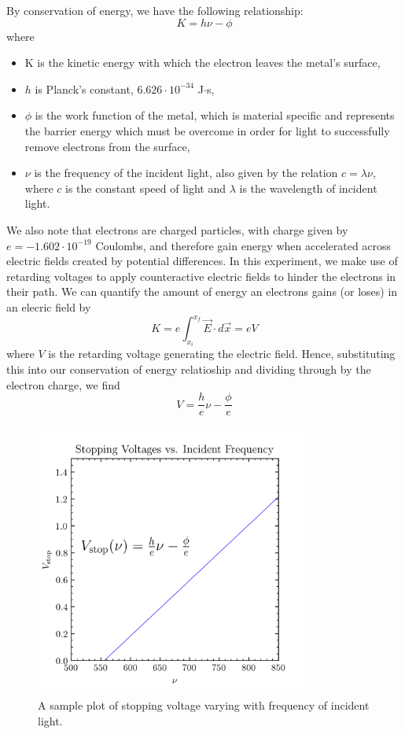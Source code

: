 \documentclass[aps,twocolumn,secnumarabic,balancelastpage,amsmath,amssymb,nofootinbib, floatfix]{revtex4-2}
\begin{document}
By conservation of energy, we have the following relationship:
$$K = h\nu - \phi$$ where
\begin{itemize}
	\item K is the kinetic energy with which the electron leaves the metal's surface,
	\item $h$ is Planck's constant, $6.626\cdot 10^{-34}$ J$\cdot$s, 
	\item $\phi$ is the work function of the metal, which is material specific and represents the barrier energy which must be overcome in order for light to successfully remove electrons from the surface,
	\item $\nu$ is the frequency of the incident light, also given by the relation $c=\lambda\nu$, where $c$ is the constant speed of light and $\lambda$ is the wavelength of incident light.
\end{itemize}

We also note that electrons are charged particles, with charge given by $e=-1.602\cdot10^{-19}$ Coulombs, and therefore gain energy when accelerated across electric fields created by potential differences. In this experiment, we make use of retarding voltages to apply counteractive electric fields to hinder the electrons in their path. We can quantify the amount of energy an electrons gains (or loses) in an elecric field by $$K=e\int_{x_{i}}^{x_{f}}\vec{E}\cdot d\vec{x}=eV$$ where $V$ is the retarding voltage generating the electric field. Hence, substituting this into our conservation of energy relatioship and dividing through by the electron charge, we find
$$V=\frac{h}{e}\nu-\frac{\phi}{e}$$

\begin{figure}[H]
	\includegraphics[width=9cm]{sample_stopping_volts.png}
	\caption{A sample plot of stopping voltage varying with frequency of incident light.}
	\label{fig:model}
\end{figure}
\end{document}
